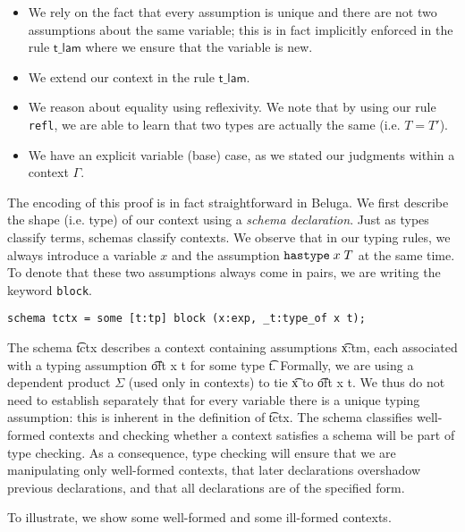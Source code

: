 \begin{itemize}
\item We rely on the fact that every assumption is unique and there
  are not two assumptions about the same variable; this is in fact
  implicitly enforced in the rule $\textsf{t\_lam}$ where we ensure
  that the variable is new.
\item We extend our context in the rule $\textsf{t\_lam}$.
\item We reason about equality using reflexivity. We note that by
  using our rule \lstinline!refl!, we are able to learn that two types
  are actually the same (i.e. $T = T'$).
\item We have an explicit variable (base) case, as we stated our judgments
  within a context $\Gamma$.
\end{itemize}


The encoding of this proof is in fact straightforward in Beluga. We
first describe the shape (i.e. type) of our context using a
\emph{schema declaration}. Just as types classify terms, schemas
classify contexts. We observe that in our typing rules, we always
introduce a variable $x$ and the assumption $\mathtt{hastype}\; x\;T$ at the same
time.
To denote that these two assumptions always come in pairs, we are
writing the keyword \lstinline!block!. 

\begin{lstlisting}
schema tctx = some [t:tp] block (x:exp, _t:type_of x t);  
\end{lstlisting}

The schema \t{tctx} describes a context containing assumptions
\t{x:tm}, each associated with a typing assumption \t{oft x t}
for some type \t{t}.  Formally, we are using a dependent product $\Sigma$
(used only in contexts) to tie \t{x} to \t{oft x t}. 
We thus do not need to establish separately that for every variable there is a
unique typing assumption: this is inherent in the definition of \t{tctx}.
The schema classifies well-formed contexts and checking whether a
context satisfies a schema will be part of type checking. As a
consequence, type checking will ensure that we are manipulating only
well-formed contexts, that later declarations overshadow previous
declarations, and that all declarations are of the specified form.

To illustrate, we show some well-formed  and some ill-formed
contexts.

